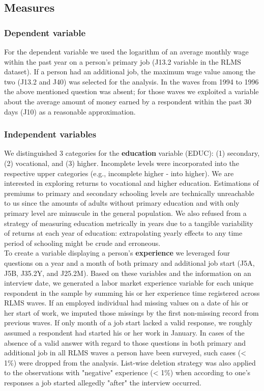 \documentclass[12pt,a4paper]{article}
\begin{document}
\subsection*{Measures}

\subsubsection*{Dependent variable}

For the dependent variable we used the logarithm of an average monthly wage within the past year on a person's primary job (J13.2 variable in the RLMS dataset). If a person had an additional job, the maximum wage value among the two (J13.2 and J40) was selected for the analysis. In the waves from 1994 to 1996 the above mentioned question was absent; for those waves we exploited a variable about the average amount of money earned by a respondent within the past 30 days (J10) as a reasonable approximation.
\\

\subsubsection*{Independent variables}

We distinguished 3 categories for the {\bf education} variable (EDUC): (1) secondary, (2) vocational, and (3) higher. Incomplete levels were incorporated into the respective upper categories (e.g., incomplete higher - into higher). We are interested in exploring returns to vocational and higher education. Estimations of premiums to primary and secondary schooling levels are technically unreachable to us since the amounts of adults without primary education and with only primary level are minuscule in the general population. We also refused from a strategy of measuring education metrically in years due to a tangible variability of returns at each year of education: extrapolating yearly effects to any time period of schooling might be crude and erroneous.
\\

To create a variable displaying a person's {\bf experience} we leveraged four questions on a year and a month of both primary and additional job start (J5A, J5B, J35.2Y, and J25.2M). Based on these variables and the information on an interview date, we generated a labor market experience variable for each unique respondent in the sample by summing his or her experience time registered across RLMS waves. If an employed individual had missing values on a date of his or her start of work, we imputed those missings by the first non-missing record from previous waves. If only month of a job start lacked a valid response, we roughly assumed a respondent had started his or her work in January. In cases of the absence of a valid answer with regard to those questions in both primary and additional job in all RLMS waves a person have been surveyed, such cases (< 1\%) were dropped from the analysis. List-wise deletion strategy was also applied to the observations with "negative" experience (< 1\%) when according to one's responses a job started allegedly "after" the interview occurred.
\\
\end{document}

